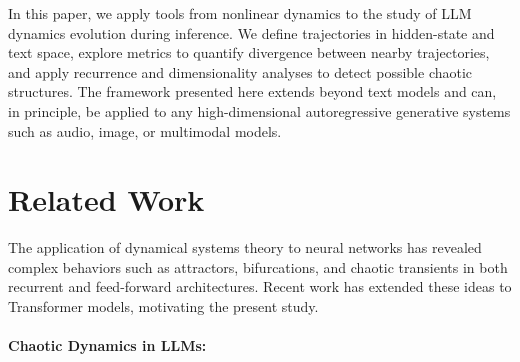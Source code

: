 \documentclass[a4paper,12pt]{article}
\begin{document}
In this paper, we apply tools from nonlinear dynamics to the study of LLM dynamics evolution during inference. We define trajectories in hidden-state and text space, explore metrics to quantify divergence between nearby trajectories, and apply recurrence and dimensionality analyses to detect possible chaotic structures. The framework presented here extends beyond text models and can, in principle, be applied to any high-dimensional autoregressive generative systems such as audio, image, or multimodal models.


\section{Related Work} 
\label{sec:related_work}

The application of dynamical systems theory to neural networks has revealed complex behaviors such as attractors, bifurcations, and chaotic transients in both recurrent and feed-forward architectures. Recent work has extended these ideas to Transformer models, motivating the present study.

\paragraph{Chaotic Dynamics in LLMs:}
\end{document}
